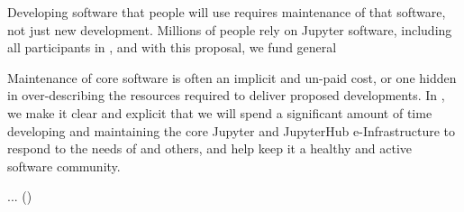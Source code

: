 \begin{task}[
  title=Maintenance of Jupyter and JupyterHub,
  id=maintenance,
  lead=SRL,
  PM=48,
  wphases={0-48},
  partners={XXX,SRL}
]
  Developing software that people will use requires maintenance of that software,
  not just new development.
  Millions of people rely on Jupyter software,
  including all participants in \TheProject,
  and with this proposal, we fund general 

  Maintenance of core software is often an implicit and un-paid cost,
  or one hidden in over-describing the resources required to deliver
  proposed developments.
  In \TheProject, we make it clear and explicit that we will spend a significant amount
  of time developing and maintaining the core Jupyter and JupyterHub
  e-Infrastructure to respond to the needs of \TheProject and others,
  and help keep it a healthy and active software community.

  \begin{compactitem}
  \item ...
    ()
  \end{compactitem}
\end{task}
